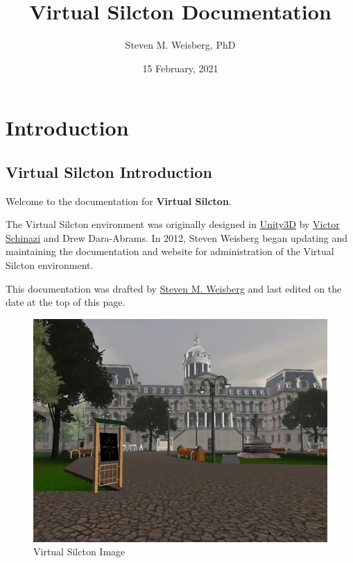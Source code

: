 \documentclass[
  12pt,
]{book}
\title{Virtual Silcton Documentation}
\author{Steven M. Weisberg, PhD}
\date{15 February, 2021}
\begin{document}
\maketitle

{
\hypersetup{linkcolor=}
\setcounter{tocdepth}{1}
\tableofcontents
}
\hypertarget{part-introduction}{%
\part*{Introduction}\label{part-introduction}}

\hypertarget{virtual-silcton-introduction}{%
\chapter{Virtual Silcton Introduction}\label{virtual-silcton-introduction}}

Welcome to the documentation for \textbf{Virtual Silcton}.

The Virtual Silcton environment was originally designed in \href{https://unity.com/}{Unity3D} by \href{https://www.vrschinazi.com/}{Victor Schinazi} and Drew Dara-Abrams. In 2012, Steven Weisberg began updating and maintaining the documentation and website for administration of the Virtual Silcton environment.

This documentation was drafted by \href{scannlab.psych.ufl.edu}{Steven M. Weisberg} and last edited on the date at the top of this page.

\begin{figure}
\centering
\includegraphics{./figs/Cover_Page.jpg}
\caption{Virtual Silcton Image}
\end{figure}
\end{document}
